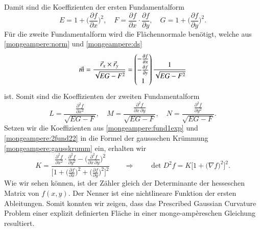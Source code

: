 Damit sind die Koeffizienten der ersten Fundamentalform 
\begin{equation}
  E = 1 + \biggl(\frac{\partial f}{\partial x}\biggr)^2, \quad
  F = \frac{\partial f}{\partial x} \cdot \frac{\partial f}{\partial y}, \quad
  G = 1 + \biggl(\frac{\partial f}{\partial y}\biggr)^2.
  \label{mongeampere:fund1exp}
\end{equation}
Für die zweite Fundamentalform wird die Flächennormale benötigt, welche aus \eqref{mongeampere:norm} und \eqref{mongeampere:ds} 
\begin{equation}
  \vec m =
\renewcommand{\arraystretch}{1.3}
\frac{\vec r_x \times \vec r_y}{\sqrt{EG-F^2}} = \begin{pmatrix}
    -\frac{\partial f}{\partial x} \\
    -\frac{\partial f}{\partial y} \\
    1
  \end{pmatrix}
  \frac{1}{\sqrt{EG-F^2}}
  \label{mongeampere:norm2}
\end{equation}
ist.
Somit sind die Koeffizienten der zweiten Fundamentalform
\begin{equation}
  L = \frac{\displaystyle\frac{\partial^2 f}{\partial x^2}}{\sqrt{EG-F}}, \quad
  M = \frac{\displaystyle\frac{\partial^2 f}{\partial x \, \partial y}}{\sqrt{EG-F}}, \quad
  N = \frac{\displaystyle\frac{\partial^2 f}{\partial y^2}}{\sqrt{EG-F}}.
  \label{mongeampere:2fund22}
\end{equation}
Setzen wir die Koeffizienten aus \eqref{mongeampere:fund1exp} und \eqref{mongeampere:2fund22} in die Formel der gaussschen Krümmung \eqref{mongeampere:gausskrumm}
ein, erhalten wir
\begin{equation}
  K = \frac{
    \displaystyle\frac{\partial^2 f}{\partial x^2} \cdot \displaystyle\frac{\partial^2 f}{\partial y^2} - \biggl(\displaystyle\frac{\partial^2 f}{\partial x \, \partial y} \biggr)^2}
    {\biggl[1 + 
    \biggl(\displaystyle\frac{\partial f}{\partial x}\biggr)^2 +
    \biggl(\displaystyle\frac{\partial f}{\partial y}\biggr)^2\biggr]^2}
\qquad\Rightarrow\qquad
    \det D^2 f = K \bigl[ 1 + 
    \bigl(\nabla f\bigr)^2\bigr]^2.
    \label{mongeampere:pd}
\end{equation}
Wie wir sehen können, ist der Zähler gleich der Determinante der hesseschen Matrix von $f(x,y)$.
Der Nenner ist eine nichtlineare Funktion der ersten Ableitungen.
Somit konnten wir zeigen, dass das Prescribed Gaussian Curvature Problem einer explizit definierten Fläche in einer 
monge-ampèreschen Gleichung resultiert.

